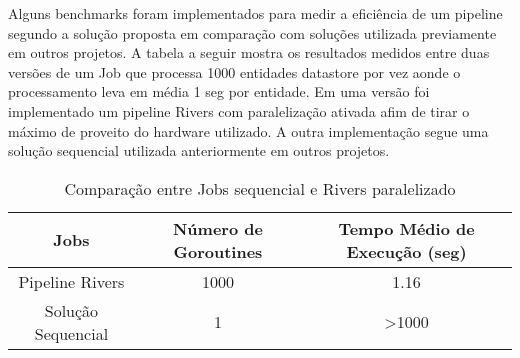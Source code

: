 Alguns benchmarks foram implementados para medir a eficiência de um pipeline segundo a solução proposta em comparação com soluções utilizada previamente em outros projetos. A tabela a seguir mostra os resultados medidos entre duas versões de um Job que processa 1000 entidades datastore por vez aonde o processamento leva em média 1 seg por entidade. Em uma versão foi implementado um pipeline Rivers com paralelização ativada afim de tirar o máximo de proveito do hardware utilizado. A outra implementação segue uma solução sequencial utilizada anteriormente em outros projetos.

\begin{table}[h!]
    \centering
    \begin{tabular}{||c c c||} 
        \hline
        Jobs & Número de Goroutines & Tempo Médio de Execução (seg) \\ [0.5ex] 
        \hline\hline
        Pipeline Rivers & 1000 & 1.16 \\ 
        \hline
        Solução Sequencial & 1 & >1000 \\ [1ex]
        \hline
    \end{tabular}
    \caption{Comparação entre Jobs sequencial e Rivers paralelizado}
    \label{benchmarks:sequential_vs_parallel}
\end{table}